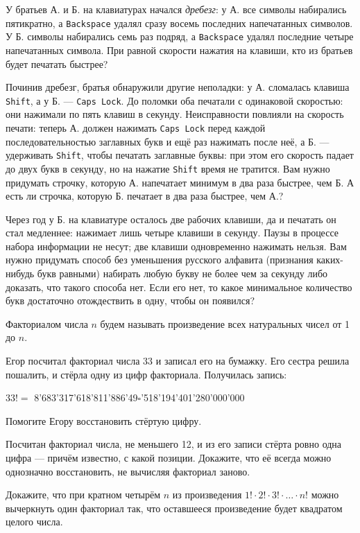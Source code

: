 \begin{itemize}
\itA У братьев А. и Б. на клавиатурах начался {\itshape дребезг}: у А. все символы набирались пятикратно, а {\verb!Backspace!} удалял сразу восемь последних напечатанных символов. У Б. символы набирались семь раз подряд, а {\verb!Backspace!} удалял последние четыре напечатанных символа. При равной скорости нажатия на клавиши, кто из братьев будет печатать быстрее?

\itB Починив дребезг, братья обнаружили другие неполадки: у А. сломалась клавиша {\verb!Shift!}, а у Б. — {\verb!Caps Lock!}. До поломки оба печатали с одинаковой скоростью: они нажимали по пять клавиш в секунду. Неисправности повлияли на скорость печати: теперь А. должен нажимать {\verb!Caps Lock!} перед каждой последовательностью заглавных букв и ещё раз нажимать после неё, а Б. — удерживать {\verb!Shift!}, чтобы печатать заглавные буквы: при этом его скорость падает до двух букв в секунду, но на нажатие {\verb!Shift!} время не тратится. Вам нужно придумать строчку, которую А. напечатает минимум в два раза быстрее, чем Б. А есть ли строчка, которую Б. печатает в два раза быстрее, чем А.?

\itC Через год у Б. на клавиатуре осталось две рабочих клавиши, да и печатать он стал медленнее: нажимает лишь четыре клавиши в секунду. Паузы в процессе набора информации не несут; две клавиши одновременно нажимать нельзя. Вам нужно придумать способ без уменьшения русского алфавита (признания каких-нибудь букв равными) набирать любую букву не более чем за секунду либо доказать, что такого способа нет. Если его нет, то какое минимальное количество букв достаточно отождествить в одну, чтобы он появился?
\end{itemize}

Факториалом числа $n$ будем называть произведение всех натуральных чисел от 1 до $n$.

\begin{itemize}
\itA Егор посчитал факториал числа 33 и записал его на бумажку. Его сестра решила пошалить, и стёрла одну из цифр факториала. Получилась запись: \smallskip \\
\centerline{$33!=$ 8'683'317'618'811'886'49$\square$'518'194'401'280'000'000} \smallskip
Помогите Егору восстановить стёртую цифру.

\itB Посчитан факториал числа, не меньшего 12, и из его записи стёрта ровно одна цифра — причём известно, с какой позиции. Докажите, что её всегда можно однозначно восстановить, не вычисляя факториал заново.

\itC Докажите, что при кратном четырём $n$ из произведения $1! \cdot 2! \cdot 3! \cdot \ldots \cdot n!$ можно вычеркнуть один факториал так, что оставшееся произведение будет квадратом целого числа.
\end{itemize}


